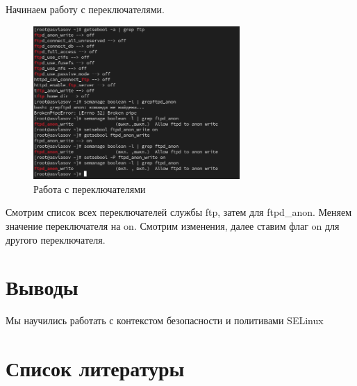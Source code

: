 \documentclass[
  12pt,
  a4paper,
  DIV=11,
  numbers=noendperiod]{scrreprt}
\begin{document}
Начинаем работу с переключателями.

\begin{figure}

{\centering \includegraphics[width=0.7\textwidth,height=\textheight]{image/9.png}

}

\caption{Работа с переключателями}

\end{figure}%

Смотрим список всех переключателей службы ftp, затем для ftpd\_anon.
Меняем значение переключателя на on. Смотрим изменения, далее ставим
флаг on для другого переключателя.

\chapter{Выводы}\label{ux432ux44bux432ux43eux434ux44b}

Мы научились работать с контекстом безопасности и политивами SELinux

\chapter*{Список
литературы}\label{ux441ux43fux438ux441ux43eux43a-ux43bux438ux442ux435ux440ux430ux442ux443ux440ux44b}

\printbibliography[heading=none]
\end{document}
